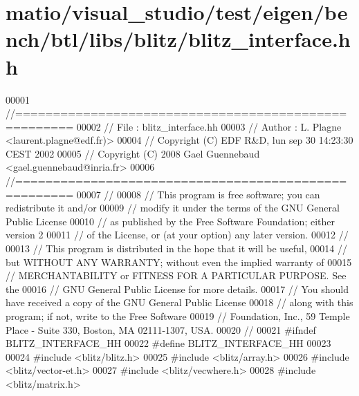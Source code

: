 \hypertarget{matio_2visual__studio_2test_2eigen_2bench_2btl_2libs_2blitz_2blitz__interface_8hh_source}{}\section{matio/visual\+\_\+studio/test/eigen/bench/btl/libs/blitz/blitz\+\_\+interface.hh}
\label{matio_2visual__studio_2test_2eigen_2bench_2btl_2libs_2blitz_2blitz__interface_8hh_source}

\begin{DoxyCode}
00001 \textcolor{comment}{//=====================================================}
00002 \textcolor{comment}{// File   :  blitz\_interface.hh}
00003 \textcolor{comment}{// Author :  L. Plagne <laurent.plagne@edf.fr)>}
00004 \textcolor{comment}{// Copyright (C) EDF R&D,  lun sep 30 14:23:30 CEST 2002}
00005 \textcolor{comment}{// Copyright (C) 2008 Gael Guennebaud <gael.guennebaud@inria.fr>}
00006 \textcolor{comment}{//=====================================================}
00007 \textcolor{comment}{//}
00008 \textcolor{comment}{// This program is free software; you can redistribute it and/or}
00009 \textcolor{comment}{// modify it under the terms of the GNU General Public License}
00010 \textcolor{comment}{// as published by the Free Software Foundation; either version 2}
00011 \textcolor{comment}{// of the License, or (at your option) any later version.}
00012 \textcolor{comment}{//}
00013 \textcolor{comment}{// This program is distributed in the hope that it will be useful,}
00014 \textcolor{comment}{// but WITHOUT ANY WARRANTY; without even the implied warranty of}
00015 \textcolor{comment}{// MERCHANTABILITY or FITNESS FOR A PARTICULAR PURPOSE.  See the}
00016 \textcolor{comment}{// GNU General Public License for more details.}
00017 \textcolor{comment}{// You should have received a copy of the GNU General Public License}
00018 \textcolor{comment}{// along with this program; if not, write to the Free Software}
00019 \textcolor{comment}{// Foundation, Inc., 59 Temple Place - Suite 330, Boston, MA  02111-1307, USA.}
00020 \textcolor{comment}{//}
00021 \textcolor{preprocessor}{#ifndef BLITZ\_INTERFACE\_HH}
00022 \textcolor{preprocessor}{#define BLITZ\_INTERFACE\_HH}
00023 
00024 \textcolor{preprocessor}{#include <blitz/blitz.h>}
00025 \textcolor{preprocessor}{#include <blitz/array.h>}
00026 \textcolor{preprocessor}{#include <blitz/vector-et.h>}
00027 \textcolor{preprocessor}{#include <blitz/vecwhere.h>}
00028 \textcolor{preprocessor}{#include <blitz/matrix.h>}

\end{DoxyCode}
